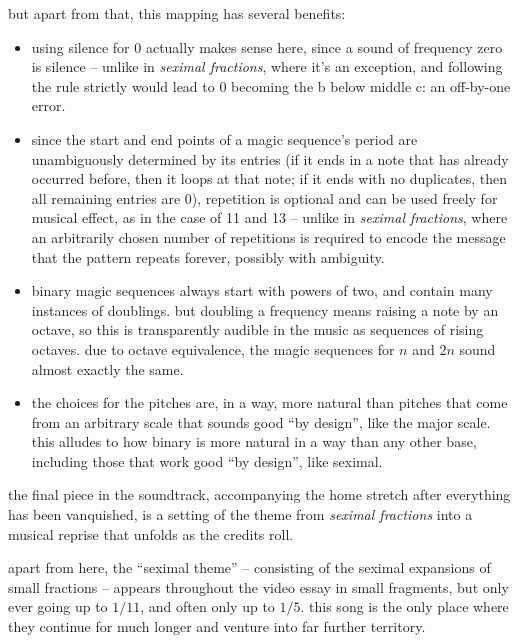 \documentclass[a4paper, 12pt]{report}
\begin{document}
but apart from that, this mapping has several benefits: \bigskip

\begin{itemize}
	\item using silence for 0 actually makes sense here, since a sound of frequency zero is silence -- unlike in {\it seximal fractions}, where it’s an exception, and following the rule strictly would lead to 0 becoming the {\sc b} below middle {\sc c}: an off-by-one error.
	\item since the start and end points of a magic sequence’s period are unambiguously determined by its entries (if it ends in a note that has already occurred before, then it loops at that note; if it ends with no duplicates, then all remaining entries are 0), repetition is optional and can be used freely for musical effect, as in the case of 11 and 13 -- unlike in {\it seximal fractions}, where an arbitrarily chosen number of repetitions is required to encode the message that the pattern repeats forever, possibly with ambiguity.
	\item binary magic sequences always start with powers of two, and contain many instances of doublings. but doubling a frequency means raising a note by an octave, so this is transparently audible in the music as sequences of rising octaves. due to octave equivalence, the magic sequences for $n$ and $2n$ sound almost exactly the same.
	\item the choices for the pitches are, in a way, more natural than pitches that come from an arbitrary scale that sounds good ``by design'', like the major scale. this alludes to how binary is more natural in a way than any other base, including those that work good ``by design'', like seximal.
\end{itemize}

\newpage


the final piece in the soundtrack, accompanying the home stretch after everything has been vanquished, is a setting of the theme from {\it seximal fractions} into a musical reprise that unfolds as the credits roll.

apart from here, the ``seximal theme'' -- consisting of the seximal expansions of small fractions -- appears throughout the video essay in small fragments, but only ever going up to $1/11$, and often only up to $1/5$. this song is the only place where they continue for much longer and venture into far further territory.
\end{document}
